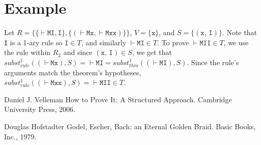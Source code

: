 \documentclass{article}
\begin{document}
\section{Example}

Let $R = \{ \{ \vdash\texttt{MI}, \texttt{I} \}, \{ (\vdash\texttt{Mx}, \vdash\texttt{Mxx}) \} \}$, $V = \{ \texttt{x} \}$, and $S = \{ (\texttt{x, I}) \}$. Note that \texttt{I} is a 1-ary rule so $\texttt{I} \in T$, and similarly $\vdash \texttt{MI} \in T$. To prove $\vdash\texttt{MII} \in T$, we use the rule within $R_2$ and since $(\texttt{x, I}) \in S$, we get that $subst_{rule}^1((\vdash\texttt{Mx}), S) = \vdash\texttt{MI} = subst_{thm}^1((\vdash\texttt{MI}), S)$. Since the rule's arguments match the theorem's hypotheses, $subst_{rule}^1((\vdash\texttt{Mxx}), S) = \vdash\texttt{MII} \in T$.

\begin{thebibliography}{1}

Daniel J. Velleman
\newblock How to Prove It: A Structured Approach.
\newblock Cambridge University Press, 2006.

Douglas Hofstadter
\newblock Godel, Escher, Bach: an Eternal Golden Braid.
\newblock Basic Books, Inc., 1979.

\end{thebibliography}
\end{document}
